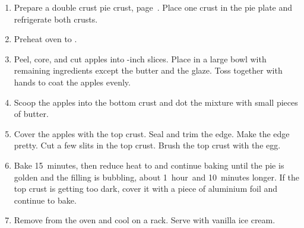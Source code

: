 
\begin{ingredients}
\end{ingredients}


\begin{recipe}
  \begin{enumerate}

  \item Prepare a double crust pie crust, page~\pageref{pie-crust}.
    Place one crust in the pie plate and refrigerate both crusts.

  \item Preheat oven to .

  \item Peel, core, and cut apples into \fracEE-inch slices.  Place in
    a large bowl with remaining ingredients except the butter and the
    glaze.  Toss together with hands to coat the apples evenly.
    
  \item Scoop the apples into the bottom crust and dot the mixture
    with small pieces of butter.

  \item Cover the apples with the top crust.  Seal and trim the edge.
    Make the edge pretty.  Cut a few slits in the top crust.  Brush
    the top crust with the egg.

  \item Bake 15~minutes, then reduce heat to  and
    continue baking until the pie is golden and the filling is
    bubbling, about 1~hour~and 10~minutes longer.  If the top crust is
    getting too dark, cover it with a piece of aluminium foil and
    continue to bake.

  \item Remove from the oven and cool on a rack.  Serve with vanilla
    ice cream.

  \end{enumerate}
\end{recipe}
